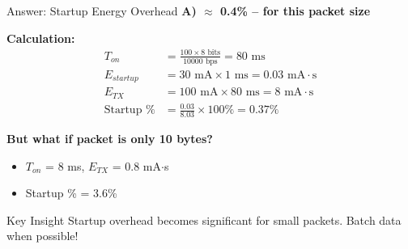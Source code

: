 \documentclass[aspectratio=169,11pt]{beamer}
\begin{document}
\begin{frame}{Answer: Startup Energy Overhead}
    \textbf{A) $\approx$ 0.4\% -- for this packet size}
    
    \vspace{0.3cm}
    \textbf{Calculation:}
    \begin{align*}
        T_{on} &= \frac{100 \times 8 \text{ bits}}{10000 \text{ bps}} = 80 \text{ ms} \\
        E_{startup} &= 30 \text{ mA} \times 1 \text{ ms} = 0.03 \text{ mA} \cdot \text{s} \\
        E_{TX} &= 100 \text{ mA} \times 80 \text{ ms} = 8 \text{ mA} \cdot \text{s} \\
        \text{Startup \%} &= \frac{0.03}{8.03} \times 100\% = 0.37\%
    \end{align*}
    
    \vspace{0.3cm}
    \textbf{But what if packet is only 10 bytes?}
    \begin{itemize}
        \item $T_{on}$ = 8 ms, $E_{TX}$ = 0.8 mA$\cdot$s
        \item Startup \% = 3.6\%
    \end{itemize}
    
    \begin{alertblock}{Key Insight}
        Startup overhead becomes significant for small packets. Batch data when possible!
    \end{alertblock}
\end{frame}
\end{document}
